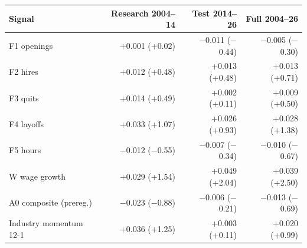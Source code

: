 \begin{tabular}{lrrr}
\toprule
Signal & Research 2004--14 & Test 2014--26 & Full 2004--26 \\
\midrule
F1 openings & +0.001 (+0.02) & $-$0.011 ($-$0.44) & $-$0.005 ($-$0.30) \\
F2 hires & +0.012 (+0.48) & +0.013 (+0.48) & +0.013 (+0.71) \\
F3 quits & +0.014 (+0.49) & +0.002 (+0.11) & +0.009 (+0.50) \\
F4 layoffs & +0.033 (+1.07) & +0.026 (+0.93) & +0.028 (+1.38) \\
F5 hours & $-$0.012 ($-$0.55) & $-$0.007 ($-$0.34) & $-$0.010 ($-$0.67) \\
W wage growth & +0.029 (+1.54) & +0.049 (+2.04) & +0.039 (+2.50) \\
A0 composite (prereg.) & $-$0.023 ($-$0.88) & $-$0.006 ($-$0.21) & $-$0.013 ($-$0.69) \\
Industry momentum 12-1 & +0.036 (+1.25) & +0.003 (+0.11) & +0.020 (+0.99) \\
\bottomrule
\end{tabular}
